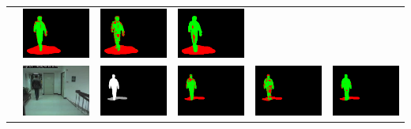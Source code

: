 \documentclass[12pt]{article}
\begin{document}
\begin{landscape}
\begin{table}[t]
\begin{tabular}{m{0.1cm}m{2.3cm}m{2.55cm}|m{2.3cm}m{2.3cm}m{2.3cm}}
      &
      \includegraphics[width=1in]{figures/csim_hallway_021_ml_results.png}
      &
      \includegraphics[width=1in]{figures/csim_hallway_021_hsv_results.png}
      &
      \includegraphics[width=1in]{figures/csim_hallway_021_ncc_results.png}
      \\ 
      &
      \includegraphics[width=1in]{figures/csim_hallway_027_original.png}
      &
      \includegraphics[width=1in]{figures/csim_hallway_027_ground_truth.png}
      &
      \includegraphics[width=1in]{figures/csim_hallway_027_ml_results.png}
      &
      \includegraphics[width=1in]{figures/csim_hallway_027_hsv_results.png}
      &
      \includegraphics[width=1in]{figures/csim_hallway_027_ncc_results.png}

\end{tabular}
\end{table}
\end{landscape}
\end{document}
